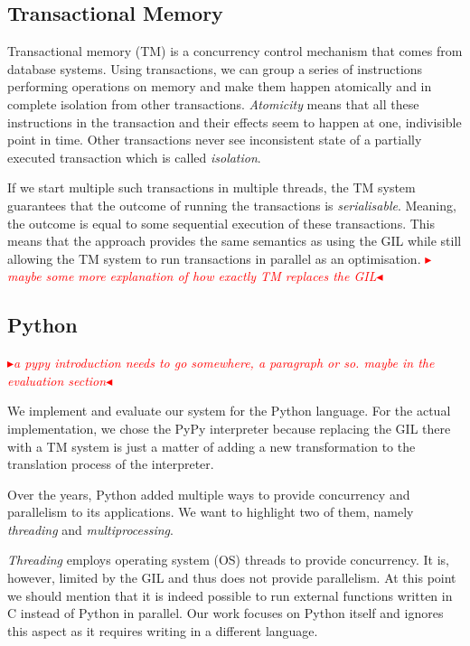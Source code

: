 \documentclass{sigplanconf}
\newcommand{\mynote}[2]{%
  \textcolor{red}{%
    \fbox{\bfseries\sffamily\scriptsize#1}%
    {\small$\blacktriangleright$\textsf{\emph{#2}}$\blacktriangleleft$}%
  }%
}
\newcommand\remi[1]{\mynote{Remi}{#1}}
\newcommand\cfbolz[1]{\mynote{cfbolz}{#1}}
\begin{document}
\subsection{Transactional Memory}

Transactional memory (TM) is a concurrency control mechanism that
comes from database systems. Using transactions, we can group a series
of instructions performing operations on memory and make them happen
atomically and in complete isolation from other
transactions. \emph{Atomicity} means that all these instructions in
the transaction and their effects seem to happen at one, indivisible
point in time. Other transactions never see inconsistent state of a
partially executed transaction which is called \emph{isolation}.

If we start multiple such transactions in multiple threads, the TM
system guarantees that the outcome of running the transactions is
\emph{serialisable}. Meaning, the outcome is equal to some sequential
execution of these transactions. This means that the approach provides the same
semantics as using the GIL
while still allowing the TM system to
run transactions in parallel as an optimisation.
\remi{maybe some more explanation of how exactly TM replaces the GIL}

\subsection{Python}

\cfbolz{a pypy introduction needs to go somewhere, a paragraph or so. maybe in the evaluation section}

We implement and evaluate our system for the Python language. For the
actual implementation, we chose the PyPy interpreter because replacing
the GIL there with a TM system is just a matter of adding a new
transformation to the translation process of the interpreter.

Over the years, Python added multiple ways to provide concurrency and
parallelism to its applications. We want to highlight two of them,
namely \emph{threading} and \emph{multiprocessing}.

\emph{Threading} employs operating system (OS) threads to provide
concurrency. It is, however, limited by the GIL and thus does not
provide parallelism. At this point we should mention that it is indeed
possible to run external functions written in C instead of Python in
parallel. Our work focuses on Python itself and ignores this aspect as
it requires writing in a different language.
\end{document}

